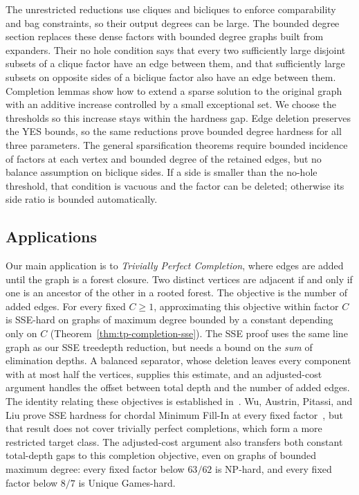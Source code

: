 The unrestricted reductions use cliques and bicliques to enforce
comparability and bag constraints, so their output degrees can be large.
The bounded degree section replaces these dense factors with bounded
degree graphs built from expanders. Their no hole condition says that every
two sufficiently large disjoint subsets of a clique factor have an edge
between them, and that sufficiently large subsets on opposite sides of a
biclique factor also have an edge between them. Completion lemmas show how
to extend a sparse solution to the original graph with an additive
increase controlled by a small exceptional set. We choose the thresholds
so this increase stays within the hardness gap. Edge deletion preserves
the YES bounds, so the same reductions prove bounded degree hardness for all three
parameters.
The general sparsification theorems require bounded incidence of factors
at each vertex and bounded degree of the retained edges, but no balance
assumption on biclique sides. If a side is smaller than the no-hole
threshold, that condition is vacuous and the factor can be deleted;
otherwise its side ratio is bounded automatically.

\subsection{Applications}

Our main application is to \emph{Trivially Perfect Completion},
where edges are added until the graph is a forest closure. Two
distinct vertices are adjacent if and only if one is an ancestor of
the other in a rooted forest. The objective is the number of added
edges. For every fixed $C\ge1$, approximating this objective within
factor $C$ is SSE-hard on graphs of maximum degree bounded by a
constant depending only on $C$
(Theorem~\ref{thm:tp-completion-sse}). The SSE proof uses the same
line graph as our SSE treedepth reduction, but needs a bound on the \emph{sum} of
elimination depths. A balanced separator, whose deletion leaves every
component with at most half the vertices, supplies this estimate,
and an adjusted-cost argument handles the offset between total depth
and the number of added edges. The identity relating these objectives
is established in~\cite{HogemoEtAl2021}. Wu, Austrin, Pitassi, and
Liu prove SSE hardness for chordal Minimum Fill-In at every fixed
factor~\cite{APW}, but that result
does not cover trivially perfect completions, which form a more
restricted target class.
The adjusted-cost argument also transfers both constant total-depth
gaps to this completion objective, even on graphs of bounded maximum
degree: every fixed factor below $63/62$ is NP-hard, and every fixed
factor below $8/7$ is Unique Games-hard.

